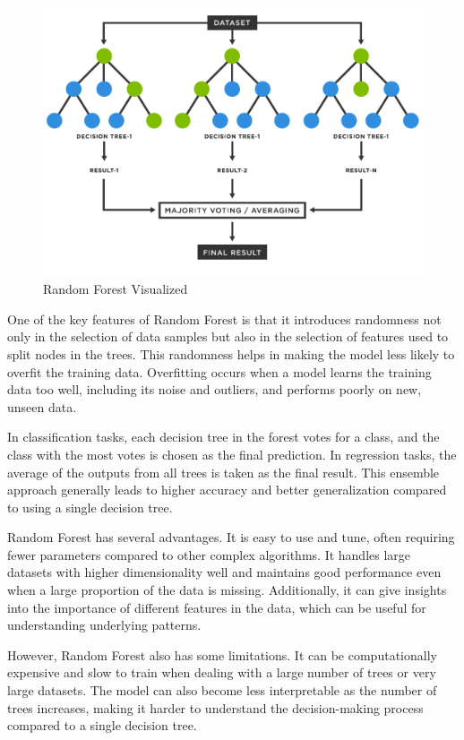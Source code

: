 \begin{figure}[htbp]
	\centering
		\includegraphics[scale=0.4]{LaTeX Bachelor Thesis Depression Signs Detection/figures/RandomForestVisualized.png}
        \caption{Random Forest Visualized \cite{predikdata2023}}
	\label{randomForestVisualized}
\end{figure}

One of the key features of Random Forest is that it introduces randomness not only in the selection of data samples but also in the selection of features used to split nodes in the trees. This randomness helps in making the model less likely to overfit the training data. Overfitting occurs when a model learns the training data too well, including its noise and outliers, and performs poorly on new, unseen data.

In classification tasks, each decision tree in the forest votes for a class, and the class with the most votes is chosen as the final prediction. In regression tasks, the average of the outputs from all trees is taken as the final result. This ensemble approach generally leads to higher accuracy and better generalization compared to using a single decision tree.

Random Forest has several advantages. It is easy to use and tune, often requiring fewer parameters compared to other complex algorithms. It handles large datasets with higher dimensionality well and maintains good performance even when a large proportion of the data is missing. Additionally, it can give insights into the importance of different features in the data, which can be useful for understanding underlying patterns.

However, Random Forest also has some limitations. It can be computationally expensive and slow to train when dealing with a large number of trees or very large datasets. The model can also become less interpretable as the number of trees increases, making it harder to understand the decision-making process compared to a single decision tree.


